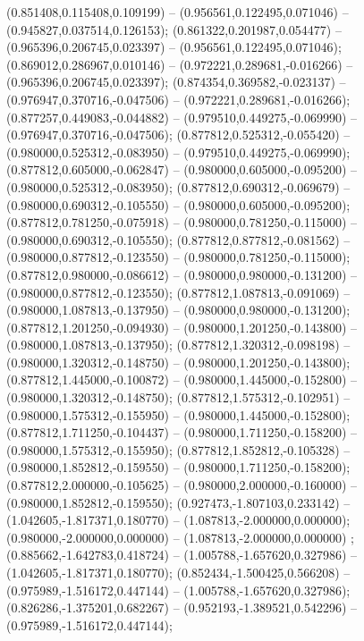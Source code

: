  (0.851408,0.115408,0.109199) -- (0.956561,0.122495,0.071046) -- (0.945827,0.037514,0.126153);
 (0.861322,0.201987,0.054477) -- (0.965396,0.206745,0.023397) -- (0.956561,0.122495,0.071046);
 (0.869012,0.286967,0.010146) -- (0.972221,0.289681,-0.016266) -- (0.965396,0.206745,0.023397);
 (0.874354,0.369582,-0.023137) -- (0.976947,0.370716,-0.047506) -- (0.972221,0.289681,-0.016266);
 (0.877257,0.449083,-0.044882) -- (0.979510,0.449275,-0.069990) -- (0.976947,0.370716,-0.047506);
 (0.877812,0.525312,-0.055420) -- (0.980000,0.525312,-0.083950) -- (0.979510,0.449275,-0.069990);
 (0.877812,0.605000,-0.062847) -- (0.980000,0.605000,-0.095200) -- (0.980000,0.525312,-0.083950);
 (0.877812,0.690312,-0.069679) -- (0.980000,0.690312,-0.105550) -- (0.980000,0.605000,-0.095200);
 (0.877812,0.781250,-0.075918) -- (0.980000,0.781250,-0.115000) -- (0.980000,0.690312,-0.105550);
 (0.877812,0.877812,-0.081562) -- (0.980000,0.877812,-0.123550) -- (0.980000,0.781250,-0.115000);
 (0.877812,0.980000,-0.086612) -- (0.980000,0.980000,-0.131200) -- (0.980000,0.877812,-0.123550);
 (0.877812,1.087813,-0.091069) -- (0.980000,1.087813,-0.137950) -- (0.980000,0.980000,-0.131200);
 (0.877812,1.201250,-0.094930) -- (0.980000,1.201250,-0.143800) -- (0.980000,1.087813,-0.137950);
 (0.877812,1.320312,-0.098198) -- (0.980000,1.320312,-0.148750) -- (0.980000,1.201250,-0.143800);
 (0.877812,1.445000,-0.100872) -- (0.980000,1.445000,-0.152800) -- (0.980000,1.320312,-0.148750);
 (0.877812,1.575312,-0.102951) -- (0.980000,1.575312,-0.155950) -- (0.980000,1.445000,-0.152800);
 (0.877812,1.711250,-0.104437) -- (0.980000,1.711250,-0.158200) -- (0.980000,1.575312,-0.155950);
 (0.877812,1.852812,-0.105328) -- (0.980000,1.852812,-0.159550) -- (0.980000,1.711250,-0.158200);
 (0.877812,2.000000,-0.105625) -- (0.980000,2.000000,-0.160000) -- (0.980000,1.852812,-0.159550);
 (0.927473,-1.807103,0.233142) -- (1.042605,-1.817371,0.180770) -- (1.087813,-2.000000,0.000000);
 (0.980000,-2.000000,0.000000) -- (1.087813,-2.000000,0.000000) ;
 (0.885662,-1.642783,0.418724) -- (1.005788,-1.657620,0.327986) -- (1.042605,-1.817371,0.180770);
 (0.852434,-1.500425,0.566208) -- (0.975989,-1.516172,0.447144) -- (1.005788,-1.657620,0.327986);
 (0.826286,-1.375201,0.682267) -- (0.952193,-1.389521,0.542296) -- (0.975989,-1.516172,0.447144);
